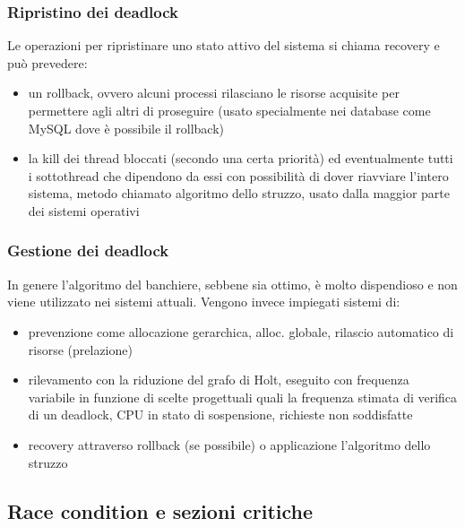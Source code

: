 \documentclass[a4paper]{article}
\begin{document}
\subsubsection*{Ripristino dei deadlock}
Le operazioni per ripristinare uno stato attivo del sistema si chiama recovery e può prevedere:
\begin{itemize}
	\item un rollback, ovvero alcuni processi rilasciano le risorse acquisite per permettere agli altri di proseguire (usato
	specialmente nei database come MySQL dove è possibile il rollback)
	\item la kill dei thread bloccati (secondo una certa priorità) ed eventualmente tutti i sottothread che dipendono da essi
	con possibilità di dover riavviare l'intero sistema, metodo chiamato algoritmo dello struzzo, usato dalla maggior parte dei
	sistemi operativi
\end{itemize}

\subsubsection*{Gestione dei deadlock}
In genere l'algoritmo del banchiere, sebbene sia ottimo, è molto dispendioso e non viene utilizzato nei sistemi attuali. Vengono
invece impiegati sistemi di:
\begin{itemize}
	\item prevenzione come allocazione gerarchica, alloc. globale, rilascio automatico di risorse (prelazione)
	\item rilevamento con la riduzione del grafo di Holt, eseguito con frequenza variabile in funzione di scelte progettuali
	quali la frequenza stimata di verifica di un deadlock, CPU in stato di sospensione, richieste non soddisfatte
	\item recovery attraverso rollback (se possibile) o applicazione l'algoritmo dello struzzo
\end{itemize}

\newpage


\subsection{Race condition e sezioni critiche}
\end{document}
